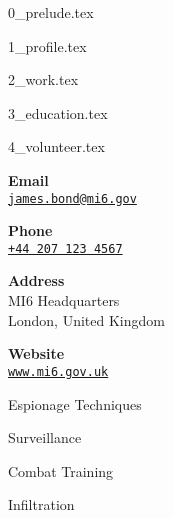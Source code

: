 \documentclass{article}
\begin{document}
{0_prelude.tex}

{1_profile.tex}

{2_work.tex}

{3_education.tex}

{4_volunteer.tex}


\cvsidebar %



\begin{cvitem}[Envelope][4]
    \textbf{Email}\\
    \href{mailto:james.bond@mi6.gov}{\texttt{james.bond@mi6.gov}}
\end{cvitem}

\cvseparator[3]
\begin{cvitem}[Phone][4]
    \textbf{Phone}\\
    \href{tel:+442071234567}{\texttt{+44 207 123 4567}}
\end{cvitem}

\cvseparator[3]
\begin{cvitem}[Home][4]
    \textbf{Address}\\
    MI6 Headquarters\\ London, United Kingdom
\end{cvitem}

\cvseparator[3]
\begin{cvitem}[Globe][4]
    \textbf{Website}\\
    \href{https://www.mi6.gov.uk}{\texttt{www.mi6.gov.uk}}
\end{cvitem}



\begin{cvitem}
    Espionage Techniques
\end{cvitem}

\cvseparator
\begin{cvitem}
    Surveillance
\end{cvitem}

\cvseparator
\begin{cvitem}
    Combat Training
\end{cvitem}

\cvseparator
\begin{cvitem}
    Infiltration
\end{cvitem}
\end{document}

